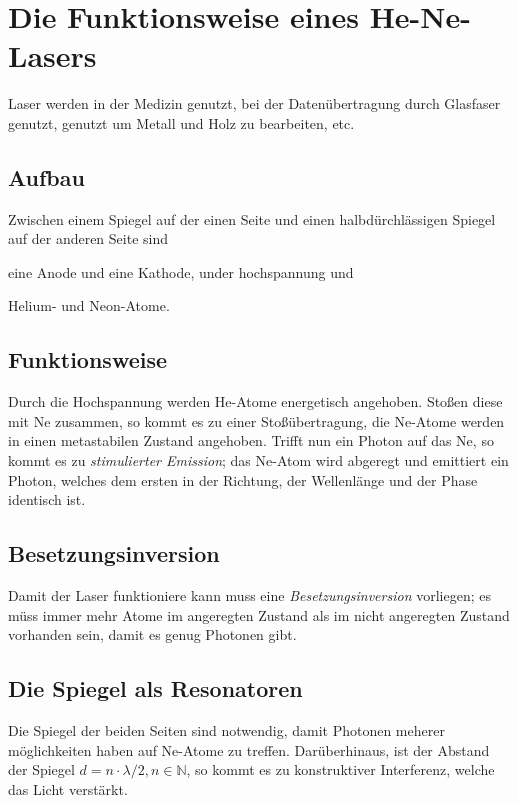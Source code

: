 \documentclass{article}
\begin{document}
\section{Die Funktionsweise eines He-Ne-Lasers}
Laser werden in der Medizin genutzt, bei der Datenübertragung durch Glasfaser genutzt, genutzt um Metall und Holz zu bearbeiten, etc.
 
\subsection{Aufbau} 
Zwischen einem Spiegel auf der einen Seite und einen halbdürchlässigen Spiegel auf der anderen Seite sind \begin{enumerate*}[label=\textbf{\alph*)}] \item eine Anode und eine Kathode, under hochspannung und \item Helium- und Neon-Atome. \end{enumerate*}
 
\subsection{Funktionsweise} 
Durch die Hochspannung werden He-Atome energetisch angehoben. Stoßen diese mit Ne zusammen, so kommt es zu einer Stoßübertragung, die Ne-Atome werden in einen metastabilen Zustand angehoben. Trifft nun ein Photon auf das Ne, so kommt es zu \emph{stimulierter Emission}; das Ne-Atom wird abgeregt und emittiert ein Photon, welches dem ersten in der Richtung, der Wellenlänge und der Phase identisch ist. 
 
\subsection{Besetzungsinversion}
Damit der Laser funktioniere kann muss eine \emph{Besetzungsinversion} vorliegen; es müss immer mehr Atome im angeregten Zustand als im nicht angeregten Zustand vorhanden sein, damit es genug Photonen gibt. 
 
\subsection{Die Spiegel als Resonatoren}
Die Spiegel der beiden Seiten sind notwendig, damit Photonen meherer möglichkeiten haben auf Ne-Atome zu treffen. Darüberhinaus, ist der Abstand der Spiegel $d=n \cdot \lambda / 2, n \in \mathbb{N}$, so kommt es zu konstruktiver Interferenz, welche das Licht verstärkt.
 
\end{document}
